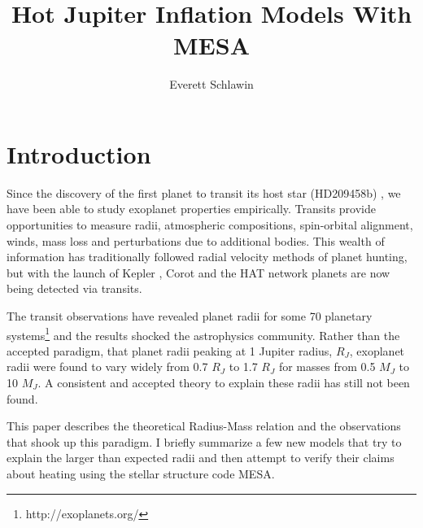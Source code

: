 \documentclass[twocolumn]{emulateapj}
\begin{document}
\title{Hot Jupiter Inflation Models With MESA}
\author{Everett Schlawin}

\maketitle
\section{Introduction}

Since the discovery of the first planet to transit its host star (HD209458b) \citep{charb,henry2000}, we have been able to study exoplanet properties empirically. Transits provide opportunities to measure radii, atmospheric compositions, spin-orbital alignment, winds, mass loss and perturbations due to additional bodies. This wealth of information has traditionally followed radial velocity methods of planet hunting, but with the launch of Kepler \citep{borucki}, Corot and the HAT network \citep{bakos} planets are now being detected via transits.

The transit observations have revealed planet radii for some 70 planetary systems\footnote{http://exoplanets.org/} and the results shocked the astrophysics community. Rather than the accepted paradigm, that planet radii peaking at 1 Jupiter radius, $R_J$, exoplanet radii were found to vary widely from 0.7 $R_J$ to 1.7 $R_J$ for masses from 0.5 $M_J$ to 10 $M_J$. A consistent and accepted theory to explain these radii has still not been found.

This paper describes the theoretical Radius-Mass relation and the observations that shook up this paradigm. I briefly summarize a few new models that try to explain the larger than expected radii and then attempt to verify their claims about heating using the stellar structure code MESA.
\end{document}
